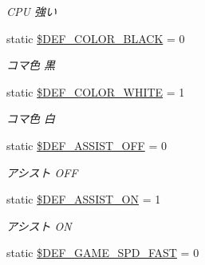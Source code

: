\begin{DoxyCompactItemize}
\begin{DoxyCompactList}\small\item\em C\+PU 強い \end{DoxyCompactList}\item 
static \hyperlink{class_reversi_const_ae9bf810749221ae09fbc5c70c2c96b2f}{\$\+D\+E\+F\+\_\+\+C\+O\+L\+O\+R\+\_\+\+B\+L\+A\+CK} = 0\hypertarget{class_reversi_const_ae9bf810749221ae09fbc5c70c2c96b2f}{}\label{class_reversi_const_ae9bf810749221ae09fbc5c70c2c96b2f}

\begin{DoxyCompactList}\small\item\em コマ色 黒 \end{DoxyCompactList}\item 
static \hyperlink{class_reversi_const_a2e8fc278815f5af6f8a3617570b0f8e3}{\$\+D\+E\+F\+\_\+\+C\+O\+L\+O\+R\+\_\+\+W\+H\+I\+TE} = 1\hypertarget{class_reversi_const_a2e8fc278815f5af6f8a3617570b0f8e3}{}\label{class_reversi_const_a2e8fc278815f5af6f8a3617570b0f8e3}

\begin{DoxyCompactList}\small\item\em コマ色 白 \end{DoxyCompactList}\item 
static \hyperlink{class_reversi_const_a5de57f1691fb59977a194f038de0ec99}{\$\+D\+E\+F\+\_\+\+A\+S\+S\+I\+S\+T\+\_\+\+O\+FF} = 0\hypertarget{class_reversi_const_a5de57f1691fb59977a194f038de0ec99}{}\label{class_reversi_const_a5de57f1691fb59977a194f038de0ec99}

\begin{DoxyCompactList}\small\item\em アシスト O\+FF \end{DoxyCompactList}\item 
static \hyperlink{class_reversi_const_ac486ec8951f7327db00d83e6c570cecb}{\$\+D\+E\+F\+\_\+\+A\+S\+S\+I\+S\+T\+\_\+\+ON} = 1\hypertarget{class_reversi_const_ac486ec8951f7327db00d83e6c570cecb}{}\label{class_reversi_const_ac486ec8951f7327db00d83e6c570cecb}

\begin{DoxyCompactList}\small\item\em アシスト ON \end{DoxyCompactList}\item 
static \hyperlink{class_reversi_const_a8c6962b66e74e00ea5a8d096d69990f9}{\$\+D\+E\+F\+\_\+\+G\+A\+M\+E\+\_\+\+S\+P\+D\+\_\+\+F\+A\+ST} = 0\hypertarget{class_reversi_const_a8c6962b66e74e00ea5a8d096d69990f9}{}\label{class_reversi_const_a8c6962b66e74e00ea5a8d096d69990f9}


\end{DoxyCompactItemize}
